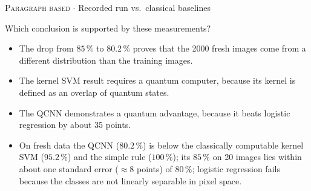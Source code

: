 \documentclass[11pt,a4paper]{article}
\newcommand{\optlabel}[1]{\textbf{(#1)}}
\newcommand{\correctlabel}[1]{\textcolor{okgreen}{\textbf{(#1)}\,\ding{51}}}
\newenvironment{qitem}[1]{\begin{list}{}{\setlength{\leftmargin}{3.3em}\setlength{\labelwidth}{3.1em}%
  \setlength{\labelsep}{0.2em}\setlength{\topsep}{3pt}\setlength{\parsep}{3pt}}\item[\textbf{Q.#1}\hfill]}{\end{list}}
\newcommand{\qmeta}[2]{{\footnotesize\color{black!60}\textsc{#1} \;$\cdot$\; #2}\par}
\begin{document}
\begin{qitem}{80}
\qmeta{Paragraph based}{Recorded run vs.\ classical baselines}
Which conclusion is supported by these measurements?
\begin{itemize}[leftmargin=2.6em, labelsep=0.4em, itemsep=2pt, topsep=3pt]
\item[\optlabel{A}] The drop from $85\,\%$ to $80.2\,\%$ proves that the 2000 fresh images come from a different distribution than the training images.
\item[\optlabel{B}] The kernel SVM result requires a quantum computer, because its kernel is defined as an overlap of quantum states.
\item[\optlabel{C}] The QCNN demonstrates a quantum advantage, because it beats logistic regression by about 35 points.
\item[\correctlabel{D}] On fresh data the QCNN ($80.2\,\%$) is below the classically computable kernel SVM ($95.2\,\%$) and the simple rule ($100\,\%$); its $85\,\%$ on 20 images lies within about one standard error ($\approx8$ points) of $80\,\%$; logistic regression fails because the classes are not linearly separable in pixel space.
\end{itemize}
\end{qitem}
\end{document}
